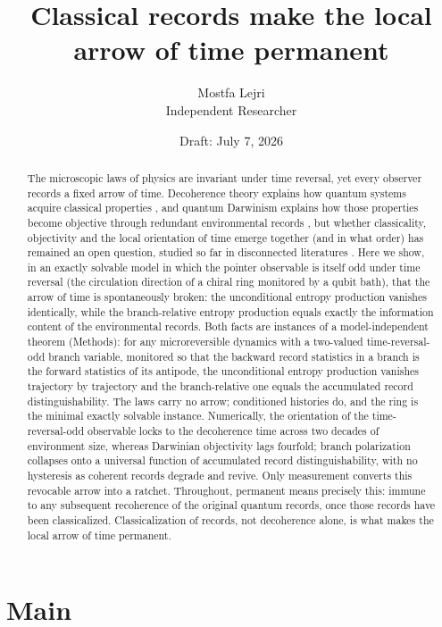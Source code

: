 \documentclass[11pt]{article}
\title{\bfseries Classical records make the local arrow of time permanent}
\author{Mostfa Lejri\\[2pt]
\small Independent Researcher}
\date{\small Draft: July 7, 2026}
\begin{document}
\maketitle

\begin{abstract}
\noindent
The microscopic laws of physics are invariant under time reversal, yet every observer records a fixed arrow of time. Decoherence theory explains how quantum systems acquire classical properties \cite{Zeh2007,Joos2003,Zurek2003}, and quantum Darwinism explains how those properties become objective through redundant environmental records \cite{Zurek2009,Riedel2012,Zurek2022}, but whether classicality, objectivity and the local orientation of time emerge together (and in what order) has remained an open question, studied so far in disconnected literatures \cite{Mlodinow2014,Chen2024,Guff2025,Aharonov2000}. Here we show, in an exactly solvable model in which the pointer observable is itself odd under time reversal (the circulation direction of a chiral ring monitored by a qubit bath), that the arrow of time is spontaneously broken: the unconditional entropy production vanishes identically, while the branch-relative entropy production equals exactly the information content of the environmental records. Both facts are instances of a model-independent theorem (Methods): for any microreversible dynamics with a two-valued time-reversal-odd branch variable, monitored so that the backward record statistics in a branch is the forward statistics of its antipode, the unconditional entropy production vanishes trajectory by trajectory and the branch-relative one equals the accumulated record distinguishability. The laws carry no arrow; conditioned histories do, and the ring is the minimal exactly solvable instance. Numerically, the orientation of the time-reversal-odd observable locks to the decoherence time across two decades of environment size, whereas Darwinian objectivity lags fourfold; branch polarization collapses onto a universal function of accumulated record distinguishability, with no hysteresis as coherent records degrade and revive. Only measurement converts this revocable arrow into a ratchet. Throughout, permanent means precisely this: immune to any subsequent recoherence of the original quantum records, once those records have been classicalized. Classicalization of records, not decoherence alone, is what makes the local arrow of time permanent.
\end{abstract}

\section*{Main}
\end{document}
